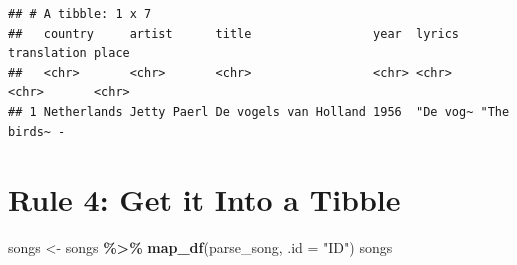 \documentclass[
]{article}
\newenvironment{Shaded}{\begin{snugshade}}{\end{snugshade}}
\newcommand{\AttributeTok}[1]{\textcolor[rgb]{0.13,0.29,0.53}{#1}}
\newcommand{\ControlFlowTok}[1]{\textcolor[rgb]{0.13,0.29,0.53}{\textbf{#1}}}
\newcommand{\DecValTok}[1]{\textcolor[rgb]{0.00,0.00,0.81}{#1}}
\newcommand{\FunctionTok}[1]{\textcolor[rgb]{0.13,0.29,0.53}{\textbf{#1}}}
\newcommand{\NormalTok}[1]{#1}
\newcommand{\OtherTok}[1]{\textcolor[rgb]{0.56,0.35,0.01}{#1}}
\newcommand{\SpecialCharTok}[1]{\textcolor[rgb]{0.81,0.36,0.00}{\textbf{#1}}}
\newcommand{\StringTok}[1]{\textcolor[rgb]{0.31,0.60,0.02}{#1}}
\begin{document}
\begin{Shaded}
\end{Shaded}

\begin{verbatim}
## # A tibble: 1 x 7
##   country     artist      title                 year  lyrics   translation place
##   <chr>       <chr>       <chr>                 <chr> <chr>    <chr>       <chr>
## 1 Netherlands Jetty Paerl De vogels van Holland 1956  "De vog~ "The birds~ -
\end{verbatim}

\section{Rule 4: Get it Into a
Tibble}\label{rule-4-get-it-into-a-tibble}

\begin{Shaded}
\begin{Highlighting}[]
\NormalTok{songs }\OtherTok{\textless{}{-}} 
\NormalTok{  songs }\SpecialCharTok{\%\textgreater{}\%} 
  \FunctionTok{map\_df}\NormalTok{(parse\_song, }\AttributeTok{.id =} \StringTok{"ID"}\NormalTok{)}
\NormalTok{songs}
\end{Highlighting}
\end{Shaded}
\end{document}
